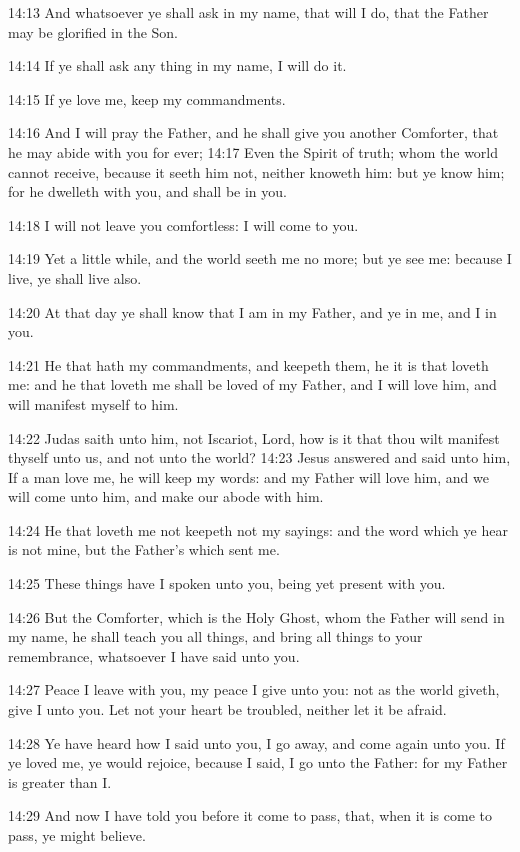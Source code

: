 14:13 And whatsoever ye shall ask in my name, that will I do, that the
Father may be glorified in the Son.

14:14 If ye shall ask any thing in my name, I will do it.

14:15 If ye love me, keep my commandments.

14:16 And I will pray the Father, and he shall give you another
Comforter, that he may abide with you for ever; 14:17 Even the Spirit
of truth; whom the world cannot receive, because it seeth him not,
neither knoweth him: but ye know him; for he dwelleth with you, and
shall be in you.

14:18 I will not leave you comfortless: I will come to you.

14:19 Yet a little while, and the world seeth me no more; but ye see
me: because I live, ye shall live also.

14:20 At that day ye shall know that I am in my Father, and ye in me,
and I in you.

14:21 He that hath my commandments, and keepeth them, he it is that
loveth me: and he that loveth me shall be loved of my Father, and I
will love him, and will manifest myself to him.

14:22 Judas saith unto him, not Iscariot, Lord, how is it that thou
wilt manifest thyself unto us, and not unto the world?  14:23 Jesus
answered and said unto him, If a man love me, he will keep my words:
and my Father will love him, and we will come unto him, and make our
abode with him.

14:24 He that loveth me not keepeth not my sayings: and the word which
ye hear is not mine, but the Father's which sent me.

14:25 These things have I spoken unto you, being yet present with you.

14:26 But the Comforter, which is the Holy Ghost, whom the Father will
send in my name, he shall teach you all things, and bring all things
to your remembrance, whatsoever I have said unto you.

14:27 Peace I leave with you, my peace I give unto you: not as the
world giveth, give I unto you. Let not your heart be troubled, neither
let it be afraid.

14:28 Ye have heard how I said unto you, I go away, and come again
unto you. If ye loved me, ye would rejoice, because I said, I go unto
the Father: for my Father is greater than I.

14:29 And now I have told you before it come to pass, that, when it is
come to pass, ye might believe.

